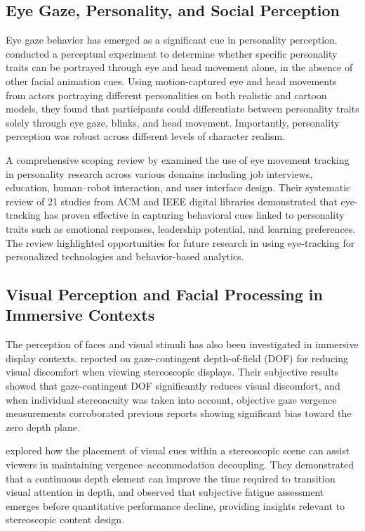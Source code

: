 \documentclass[12pt,a4paper]{article}
\begin{document}
\subsection{Eye Gaze, Personality, and Social Perception}

Eye gaze behavior has emerged as a significant cue in personality perception. \citet{ruhland2014perception} conducted a perceptual experiment to determine whether specific personality traits can be portrayed through eye and head movement alone, in the absence of other facial animation cues. Using motion-captured eye and head movements from actors portraying different personalities on both realistic and cartoon models, they found that participants could differentiate between personality traits solely through eye gaze, blinks, and head movement. Importantly, personality perception was robust across different levels of character realism.

A comprehensive scoping review by \citet{skala2025use} examined the use of eye movement tracking in personality research across various domains including job interviews, education, human--robot interaction, and user interface design. Their systematic review of 21 studies from ACM and IEEE digital libraries demonstrated that eye-tracking has proven effective in capturing behavioral cues linked to personality traits such as emotional responses, leadership potential, and learning preferences. The review highlighted opportunities for future research in using eye-tracking for personalized technologies and behavior-based analytics.

\subsection{Visual Perception and Facial Processing in Immersive Contexts}

The perception of faces and visual stimuli has also been investigated in immersive display contexts. \citet{duchowski2014reducing} reported on gaze-contingent depth-of-field (DOF) for reducing visual discomfort when viewing stereoscopic displays. Their subjective results showed that gaze-contingent DOF significantly reduces visual discomfort, and when individual stereoacuity was taken into account, objective gaze vergence measurements corroborated previous reports showing significant bias toward the zero depth plane.

\citet{poulakos2015alternating} explored how the placement of visual cues within a stereoscopic scene can assist viewers in maintaining vergence--accommodation decoupling. They demonstrated that a continuous depth element can improve the time required to transition visual attention in depth, and observed that subjective fatigue assessment emerges before quantitative performance decline, providing insights relevant to stereoscopic content design.
\end{document}
